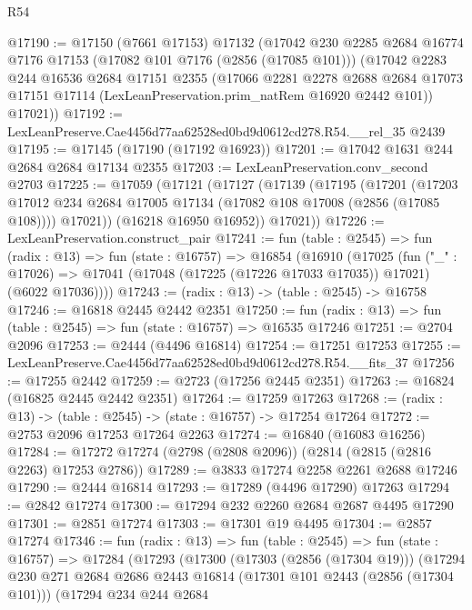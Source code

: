 \begin{lexlean}{R54}
\begin{coremodule}
@17190 := @17150
    (@7661 @17153)
    @17132
    (@17042
      @230
      @2285
      @2684
      @16774
      @7176
      @17153
      (@17082 @101 @7176 (@2856 (@17085 @101)))
      (@17042
        @2283
        @244
        @16536
        @2684
        @17151
        @2355
        (@17066
          @2281
          @2278
          @2688
          @2684
          @17073
          @17151
          @17114
          (LexLeanPreservation.prim_natRem @16920 @2442 @101))
        @17021))
@17192 := LexLeanPreserve.Cae4456d77aa62528ed0bd9d0612cd278.R54.__rel_35 @2439
@17195 := @17145 (@17190 (@17192 @16923))
@17201 := @17042 @1631 @244 @2684 @2684 @17134 @2355
@17203 := LexLeanPreservation.conv_second @2703
@17225 := @17059
    (@17121
      (@17127
        (@17139
          (@17195
            (@17201
              (@17203 @17012 @234 @2684 @17005 @17134 (@17082 @108 @17008 (@2856 (@17085 @108))))
              @17021))
          (@16218 @16950 @16952))
        @17021))
@17226 := LexLeanPreservation.construct_pair
@17241 := fun (table : @2545) =>
  fun (radix : @13) =>
  fun (state : @16757) =>
  @16854
    (@16910
      (@17025
        (fun ("_" : @17026) =>
        @17041 (@17048 (@17225 (@17226 @17033 @17035)) @17021) (@6022 @17036))))
@17243 := (radix : @13) -> (table : @2545) -> @16758
@17246 := @16818 @2445 @2442 @2351
@17250 := fun (radix : @13) => fun (table : @2545) => fun (state : @16757) => @16535 @17246
@17251 := @2704 @2096
@17253 := @2444 (@4496 @16814)
@17254 := @17251 @17253
@17255 := LexLeanPreserve.Cae4456d77aa62528ed0bd9d0612cd278.R54.__fits_37
@17256 := @17255 @2442
@17259 := @2723 (@17256 @2445 @2351)
@17263 := @16824 (@16825 @2445 @2442 @2351)
@17264 := @17259 @17263
@17268 := (radix : @13) -> (table : @2545) -> (state : @16757) -> @17254 @17264
@17272 := @2753 @2096 @17253 @17264 @2263
@17274 := @16840 (@16083 @16256)
@17284 := @17272 @17274 (@2798 (@2808 @2096)) (@2814 (@2815 (@2816 @2263) @17253 @2786))
@17289 := @3833 @17274 @2258 @2261 @2688 @17246
@17290 := @2444 @16814
@17293 := @17289 (@4496 @17290) @17263
@17294 := @2842 @17274
@17300 := @17294 @232 @2260 @2684 @2687 @4495 @17290
@17301 := @2851 @17274
@17303 := @17301 @19 @4495
@17304 := @2857 @17274
@17346 := fun (radix : @13) =>
  fun (table : @2545) =>
  fun (state : @16757) =>
  @17284
    (@17293
      (@17300
        (@17303 (@2856 (@17304 @19)))
        (@17294
          @230
          @271
          @2684
          @2686
          @2443
          @16814
          (@17301 @101 @2443 (@2856 (@17304 @101)))
          (@17294
            @234
            @244
            @2684

\end{coremodule}
\end{lexlean}
